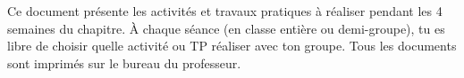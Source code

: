 \teteSndAtom

\vspace*{-40pt}
\vspace*{-8pt}

  Ce document présente les activités et travaux pratiques à réaliser pendant les 4 semaines du chapitre.
  À chaque séance (en classe entière ou demi-groupe), tu es libre de choisir quelle activité ou TP réaliser avec ton groupe.
  Tous les documents sont imprimés sur le bureau du professeur.


\vspace*{-16pt}

